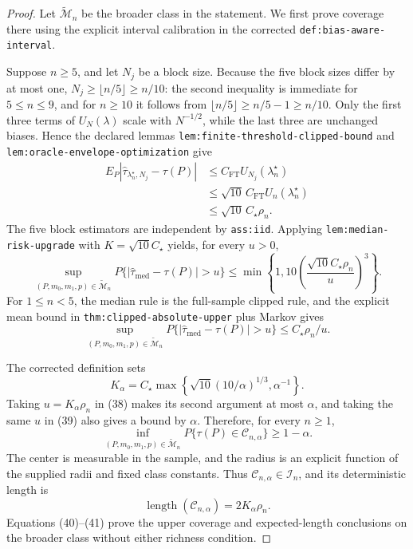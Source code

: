 \documentclass{article}
\begin{document}
\begin{proof}
Let \(\widetilde{\mathcal M}_n\) be the broader class in the statement.  We
first prove coverage there using the explicit interval calibration in the
corrected \texttt{def:bias-aware-interval}.

Suppose \(n\geq5\), and let \(N_j\) be a block size.  Because the five block sizes differ by at most one, \(N_j\geq\lfloor n/5\rfloor\geq n/10\): the second inequality is immediate for \(5\leq n\leq9\), and for \(n\geq10\) it follows from \(\lfloor n/5\rfloor\geq n/5-1\geq n/10\).  Only the first three terms of \(U_N(\lambda)\) scale with \(N^{-1/2}\), while the last three are unchanged biases.  Hence the declared lemmas \texttt{lem:finite-threshold-clipped-bound} and \texttt{lem:oracle-envelope-optimization} give \[\begin{split}
E_P|\widehat\tau_{\lambda_n^\star,N_j}-\tau(P)|
&\leq C_{\mathrm{FT}}U_{N_j}(\lambda_n^\star)\\
&\leq\sqrt{10}\,C_{\mathrm{FT}}U_n(\lambda_n^\star)\\
&\leq\sqrt{10}\,C_\star\rho_n.
\end{split} \tag{37}
\]
The five block estimators are independent by \texttt{ass:iid}.  Applying
\texttt{lem:median-risk-upgrade} with
\(K=\sqrt{10}C_\star\) yields, for every \(u>0\),
\[
\sup_{(P,m_0,m_1,p)\in\widetilde{\mathcal M}_n}
P\{|\widehat\tau_{\mathrm{med}}-\tau(P)|>u\}
\leq\min\!\left\{1,10\left(\frac{\sqrt{10}C_\star\rho_n}{u}\right)^3\right\}.
                                                                        \tag{38}
\]
For \(1\leq n<5\), the median rule is the full-sample clipped rule, and the explicit mean bound in \texttt{thm:clipped-absolute-upper} plus Markov gives
\[
\sup_{(P,m_0,m_1,p)\in\widetilde{\mathcal M}_n}
P\{|\widehat\tau_{\mathrm{med}}-\tau(P)|>u\}
\leq C_\star\rho_n/u.                                             \tag{39}
\]

The corrected definition sets
\[
K_\alpha=C_\star\max\!\left\{
\sqrt{10}(10/\alpha)^{1/3},\alpha^{-1}\right\}.
\]
Taking \(u=K_\alpha\rho_n\) in (38) makes its second argument at most
\(\alpha\), and taking the same \(u\) in (39) also gives a bound by
\(\alpha\).  Therefore, for every \(n\geq1\),
\[
\inf_{(P,m_0,m_1,p)\in\widetilde{\mathcal M}_n}
P\{\tau(P)\in\mathcal C_{n,\alpha}\}\geq1-\alpha.                 \tag{40}
\]
The center is measurable in the sample, and the radius is an explicit function
of the supplied radii and fixed class constants.  Thus
\(\mathcal C_{n,\alpha}\in\mathcal I_n\), and its deterministic length is
\[
\operatorname{length}(\mathcal C_{n,\alpha})
=2K_\alpha\rho_n.                                                  \tag{41}
\]
Equations (40)--(41) prove the upper coverage and expected-length conclusions
on the broader class without either richness condition.


\end{proof}
\end{document}
